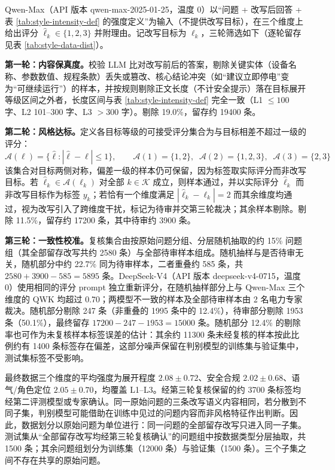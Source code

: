 \documentclass[fontset=fandol,type=master,campus=shenzhen,etitleauto=true]{hithesisbook}
\begin{document}
Qwen-Max（API 版本 qwen-max-2025-01-25，温度 0）以“问题 + 改写后回答 + 表 \ref{tab:style-intensity-def} 的强度定义”为输入（不提供改写目标），在三个维度上给出评分 $\hat{\ell}_k \in \{1, 2, 3\}$ 并附理由。记改写目标为 $\ell_k$，三轮筛选如下（逐轮留存见表 \ref{tab:style-data-dist}）。

\textbf{第一轮：内容保真度。}校验 LLM 比对改写前后的答案，剔除关键实体（设备名称、参数数值、规程条款）丢失或篡改、核心结论冲突（如“建议立即停电”变为“可继续运行”）的样本，并按规则剔除正文长度（不计安全提示）落在目标展开等级区间之外者，长度区间与表 \ref{tab:style-intensity-def} 完全一致（L1 $\leq 100$ 字、L2 101--300 字、L3 $> 300$ 字）。剔除 19.0\%，留存约 19400 条。

\textbf{第二轮：风格达标。}定义各目标等级的可接受评分集合为与目标相差不超过一级的评分：
\begin{equation}\label{eq:accept-level}
\mathcal{A}(\ell) = \bigl\{ \hat{\ell} : |\hat{\ell} - \ell| \le 1 \bigr\}, \qquad \mathcal{A}(1) = \{1, 2\}, \;\; \mathcal{A}(2) = \{1, 2, 3\}, \;\; \mathcal{A}(3) = \{2, 3\}
\end{equation}
该集合对目标两侧对称，偏差一级的样本仍可保留，因为标签取实际评分而非改写目标。若 $\hat{\ell}_k \in \mathcal{A}(\ell_k)$ 对全部 $k \in \mathcal{K}$ 成立，则样本通过，并以实际评分 $\hat{\ell}_k$ 而非改写目标作为标签 $y_k$；若恰有一个维度满足 $|\hat{\ell}_k - \ell_k| = 2$ 而其余维度均通过，视为改写引入了跨维度干扰，标记为待审并交第三轮裁决；其余样本剔除。剔除 11.5\%，留存约 17200 条，其中待审约 3900 条。

\textbf{第三轮：一致性校准。}复核集合由按原始问题分组、分层随机抽取的约 15\% 问题组（其全部留存改写共约 2580 条）与全部待审样本组成。随机抽样与是否待审无关，随机部分中约 22.7\% 同为待审样本，二者重叠约 585 条，共 $2580 + 3900 - 585 = 5895$ 条。DeepSeek-V4（API 版本 deepseek-v4-0715，温度 0）使用相同的评分 prompt 独立重新评分，在随机抽样部分上与 Qwen-Max 三个维度的 QWK 均超过 0.70；两模型不一致的样本及全部待审样本由 2 名电力专家裁决。随机部分剔除 247 条（非重叠的 1995 条中的 12.4\%），待审部分剔除 1953 条（50.1\%），最终留存 $17200 - 247 - 1953 = 15000$ 条。随机部分 12.4\% 的剔除率也可作为未复核样本标签误差的估计：其余约 11300 条未经复核的样本按此比例约有 1400 条标签存在偏差，这部分噪声保留在判别模型的训练集与验证集中，测试集标签不受影响。

最终数据三个维度的平均强度为展开程度 $2.08 \pm 0.72$、安全合规 $2.02 \pm 0.68$、语气/角色定位 $2.05 \pm 0.70$，均覆盖 L1--L3。经第三轮复核保留的约 3700 条标签均经第二评测模型或专家确认。同一原始问题的三条改写语义内容相同，若分散到不同子集，判别模型可能借助在训练中见过的问题内容而非风格特征作出判断。因此，数据划分以原始问题为单位进行：同一问题的全部留存改写只进入同一子集。测试集从“全部留存改写均经第三轮复核确认”的问题组中按数据类型分层抽取，共 1500 条；其余问题组划分为训练集（12000 条）与验证集（1500 条）。三个子集之间不存在共享的原始问题。
\end{document}
